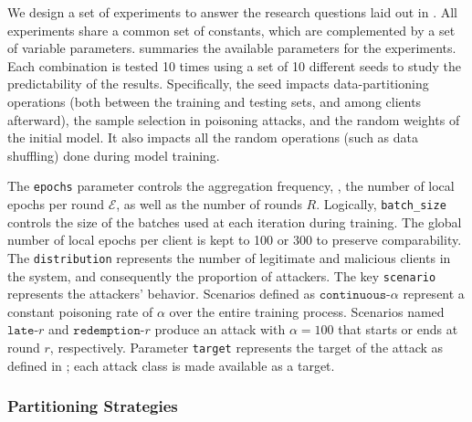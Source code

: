 We design a set of experiments to answer the research questions laid out in .
All experiments share a common set of constants, which are complemented by a set of variable parameters.
 summaries the available parameters for the experiments.
Each combination is tested 10 times using a set of 10 different seeds to study the predictability of the results.
Specifically, the seed impacts data-partitioning operations (both between the training and testing sets, and among clients afterward), the sample selection in poisoning attacks, and the random weights of the initial model. It also impacts all the random operations (such as data shuffling) done during model training.

The \texttt{epochs} parameter controls the aggregation frequency, \ie, the number of local epochs per round $\mathcal{E}$, as well as the number of rounds $R$.
Logically, \texttt{batch\_size} controls the size of the batches used at each iteration during training.
The global number of local epochs per client is kept to 100 or 300 to preserve comparability.
The \texttt{distribution} represents the number of legitimate and malicious clients in the system, and consequently the proportion of attackers.
The key \texttt{scenario} represents the attackers' behavior. 
Scenarios defined as $\texttt{continuous-}\alpha$ represent a constant poisoning rate of $\alpha$ over the entire training process.
Scenarios named $\texttt{late-}r$ and $\texttt{redemption-}r$ produce an attack with $\alpha=100$ that starts or ends at round $r$, respectively.
Parameter \texttt{target} represents the target of the attack as defined in ; each attack class is made available as a target. 


\subsubsection{Partitioning Strategies\label{sec:assess.method.partition}}

